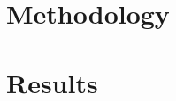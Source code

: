 \documentclass[a4paper, oneside]{discothesis}
\begin{document}





\chapter{Methodology}

\chapter{Results}
\end{document}
